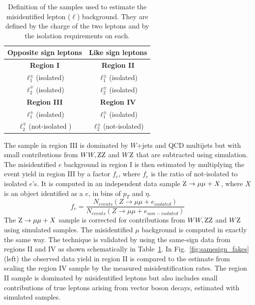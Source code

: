 \documentclass[oneside, letterpaper, oldfontcommands]{memoir}
\begin{document}
{{{\begin{table}[hbt]
 \centering
 {
 \renewcommand{\arraystretch}{1.1}
 \caption{Definition of the samples used to estimate the misidentified lepton ($\ell$) background. They
are defined by the charge of the two leptons and by the isolation requirements on each.}
  \label{tab:fakeratediagram}

  \begin{tabular}{c|c}
  Opposite sign leptons & Like sign leptons \\
  \hline
\textbf{Region I}              &  \textbf{Region II}             \\ \hline
$\ell^{\pm}_{1}$(isolated)  &  $\ell^{\pm}_{1}$(isolated)             \\
$\ell^{\mp}_{2}$(isolated)  &  $\ell^{\pm}_{2}$(isolated)             \\

\hline \hline
\textbf{Region III}           &  \textbf{Region IV}             \\ \hline
$\ell^{\pm}_{1}$(isolated)  &  $\ell^{\pm}_{1}$(isolated)             \\
$\ell^{\mp}_{2}$(not-isolated )  &  $\ell^{\pm}_{2}$(not-isolated)             \\
\hline
  \end{tabular}
}
\end{table}

The sample in region III is dominated by $W$+jets and QCD multijets but with small
contributions from $WW,\mathrm{Z}\mathrm{Z}$ and $W\mathrm{Z}$  that are subtracted using
simulation. The misidentified  $e$ background in region I is then estimated by multiplying the event yield in region III by a
factor $f_{e}$, where $f_{e}$ is the ratio
of not-isolated to isolated $e$'s. It is computed in an independent data sample $\mathrm{Z} \rightarrow \mu \mu + X$, where $X$ is an object identified as a $e$, in bins of $p_{T}$ and $\eta$.
\begin{equation}
f_{e}=\frac{ N_{events}(Z \rightarrow \mu \mu + e_{isolated}) }{N_{events}(Z \rightarrow \mu \mu + e_{non-isolated}) }
\end{equation}
The $\mathrm{Z} \rightarrow \mu \mu + X$ sample is corrected for contributions from $WW,\mathrm{Z}\mathrm{Z}$ and $W\mathrm{Z}$ using  simulated samples.
The misidentified $\mu$ background is computed in exactly the same way.
The technique is validated by using the  same-sign data from regions II and IV
as shown schematically  in Table~\ref{tab:fakeratediagram}.
In Fig.~\ref{fig:samesign_fakes}(left) the observed data yield in region II is compared
to the estimate from scaling the region IV sample
by the measured misidentification rates. The region II  sample is dominated by
misidentified leptons but also includes  small contributions of true leptons arising
from vector boson decays,  estimated with simulated samples.

}}}
\end{document}
